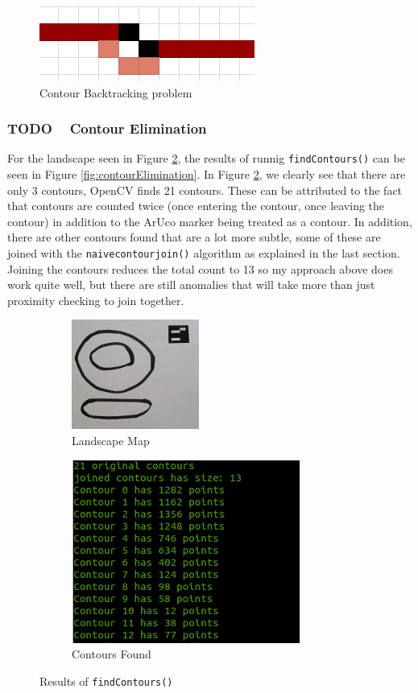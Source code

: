 \documentclass[11pt]{article}
\begin{document}
\begin{figure}[!h]
	\centering
	\includegraphics[scale=0.8]{pics/backtrack.png}
	\caption{Contour Backtracking problem}
	\label{backtrack}
\end{figure}

\subsubsection{TODO ~ Contour Elimination}
For the landscape seen in Figure \ref{eliminationInput}, the results of
runnig \texttt{findContours()} can be seen in 
Figure \ref{fig:contourElimination}. In Figure \ref{eliminationInput}, we
clearly see that there are only 3 contours, OpenCV finds 21 contours. These
can be attributed to the fact that contours are counted twice (once entering
the contour, once leaving the contour) in addition to the ArUco marker being
treated as a contour. In addition, there are other contours found that are
a lot more subtle, some of these are joined with the \texttt{naivecontourjoin()}
algorithm as explained in the last section. Joining the contours
reduces the total count to 13 so my approach above does work quite well, but
there are still anomalies that will take more than just proximity checking
to join together. 

\begin{figure}[!h]
	\centering
	\begin{subfigure}[t]{0.45\textwidth}
		\centering
		\includegraphics[scale=1.4]{pics/elimination.jpg}
		\caption{Landscape Map}
		\label{eliminationInput}
	\end{subfigure}
	\hfill
	\begin{subfigure}[t]{0.45\textwidth}
		\centering
		\includegraphics[scale=0.8]{pics/eliminationResults.png}
		\caption{Contours Found}
		\label{eliminationResults}
	\end{subfigure}
	\caption{Results of \texttt{findContours()}}
	\label{elimination}
\end{figure}
\end{document}
